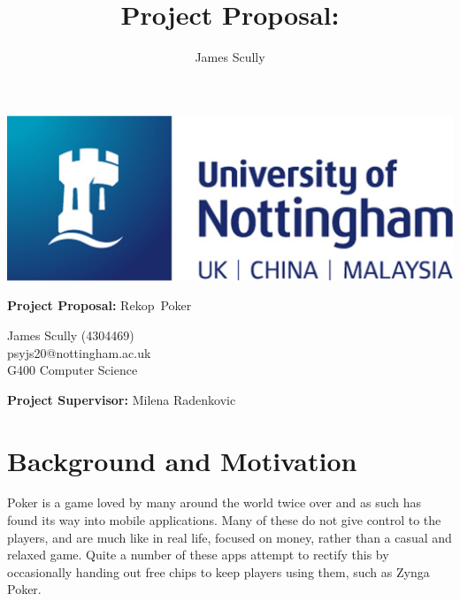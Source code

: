 \documentclass[12pt]{article}
\title{Project Proposal: \pt}
\author{James Scully}
\newcommand{\pn}{Rekop}
\begin{document}
{\selectfont


\hspace{0pt}

\vfill

\begin{center}
	\includegraphics[scale=0.35]{uni_logo}
	
	\vspace{1cm}
	
	{\Large \textbf{Project Proposal:} \pn \ Poker} \linebreak
	
	\begin{large}
		James Scully (4304469) \\
		psyjs20@nottingham.ac.uk \\
		G400 Computer Science \\
	\end{large}
	
\end{center}

\vfill

\begin{center}
	\textbf{Project Supervisor:} Milena Radenkovic
\end{center}

\hspace{0pt}

\pagebreak

\section*{Background and Motivation}



Poker is a game loved by many around the world twice over and as such has found its way into mobile applications. Many of these do not give control to the players, and are much like in real life, focused on money, rather than a casual and relaxed game. Quite a number of these apps attempt to rectify this by occasionally handing out free chips to keep players using them, such as Zynga Poker. \\

}
\end{document}
